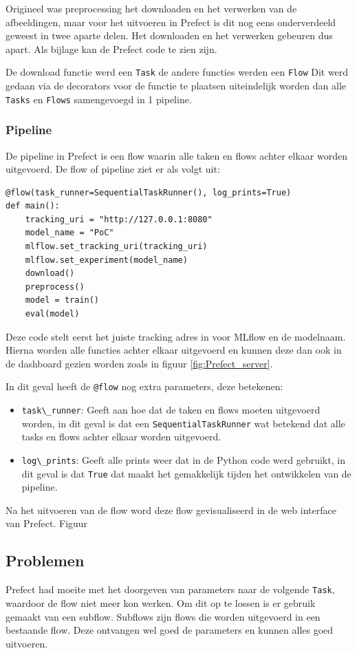 Origineel was preprocessing het downloaden en het verwerken van de afbeeldingen, maar voor het uitvoeren in Prefect is dit nog eens onderverdeeld geweest in twee aparte delen. Het downloaden en het verwerken gebeuren dus apart. Als bijlage kan de Prefect code te zien zijn.

De download functie werd een \verb+Task+ de andere functies werden een \verb+Flow+
Dit werd gedaan via de decorators voor de functie te plaatsen uiteindelijk worden dan alle \verb+Tasks+ en \verb+Flows+ samengevoegd in 1 pipeline.
\subsubsection{Pipeline}
De pipeline in Prefect is een flow waarin alle taken en flows achter elkaar worden uitgevoerd. De flow of pipeline ziet er als volgt uit:
\begin{verbatim}
@flow(task_runner=SequentialTaskRunner(), log_prints=True)
def main():
    tracking_uri = "http://127.0.0.1:8080"
    model_name = "PoC"
    mlflow.set_tracking_uri(tracking_uri)
    mlflow.set_experiment(model_name)
    download()
    preprocess()
    model = train()
    eval(model)
\end{verbatim}

Deze code stelt eerst het juiste tracking adres in voor MLflow en de modelnaam. Hierna worden alle functies achter elkaar uitgevoerd en kunnen deze dan ook in de dashboard gezien worden zoals in figuur \ref{fig:Prefect_server}.

In dit geval heeft de \verb+@flow+ nog extra parameters, deze betekenen:
\begin{itemize}
    \item \verb+task\_runner+: Geeft aan hoe dat de taken en flows moeten uitgevoerd worden, in dit geval is dat een \verb+SequentialTaskRunner+ wat betekend dat alle tasks en flows achter elkaar worden uitgevoerd.
    \item \verb+log\_prints+: Geeft alle prints weer dat in de Python code werd gebruikt, in dit geval is dat \verb+True+ dat maakt het gemakkelijk tijden het ontwikkelen van de pipeline.
\end{itemize}

Na het uitvoeren van de flow word deze flow gevisualiseerd in de web interface van Prefect. Figuur 
\subsection{Problemen}
Prefect had moeite met het doorgeven van parameters naar de volgende \verb+Task+, waardoor de flow niet meer kon werken. Om dit op te lossen is er gebruik gemaakt van een subflow. Subflows zijn flows die worden uitgevoerd in een bestaande flow. Deze ontvangen wel goed de parameters en kunnen alles goed uitvoeren.

